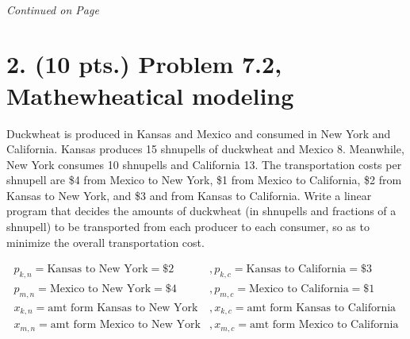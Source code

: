 \documentclass[11pt]{article}
\begin{document}
     


\label{pg:end-of-p1}
%
 \paragraph{} \emph{Continued on Page \pageref{pg:p1-continuation}}

\newpage

\pagestyle{plain}

\section*{2.  (10 pts.) Problem 7.2, Mathewheatical modeling}

Duckwheat is produced in Kansas and Mexico and consumed in New York and California.
Kansas produces 15 shnupells of duckwheat and Mexico 8. Meanwhile, New York consumes
10 shnupells and California 13. The transportation costs per shnupell are \$4 from Mexico to
New York, \$1 from Mexico to California, \$2 from Kansas to New York, and \$3 and from Kansas
to California. Write a linear program that decides the amounts of duckwheat (in shnupells
and fractions of a shnupell) to be transported from each producer to each consumer, so as to
minimize the overall transportation cost.

\begin{equation*}
  \begin{aligned}
    p_{k,n}=\mbox{Kansas to New York}=\$2 &,p_{k,c}=\mbox{Kansas to California}= \$3\\
    p_{m,n}=\mbox{Mexico to New York}=\$4 &,p_{m,c}=\mbox{Mexico to California}= \$1\\
    x_{k,n}=\mbox{amt form Kansas to New York}&,x_{k,c}=\mbox{amt form Kansas to California}\\
    x_{m,n}=\mbox{amt form Mexico to New York}&,x_{m,c}=\mbox{amt form Mexico to California}\\
  \end{aligned}
\end{equation*}
\end{document}
